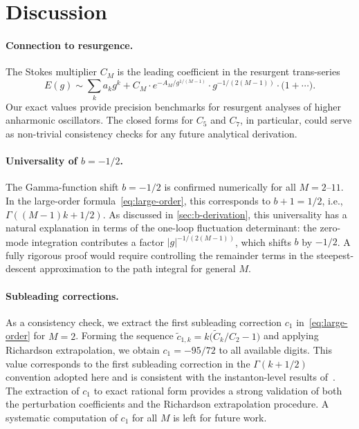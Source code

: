 \documentclass[12pt,a4paper]{article}
\numberwithin{equation}{section}
\theoremstyle{plain}
\theoremstyle{definition}
\theoremstyle{remark}
\begin{document}
\section{Discussion}
\label{sec:discussion}

\paragraph{Connection to resurgence.}
The Stokes multiplier $C_M$ is the leading coefficient in the resurgent
trans-series
\begin{equation}\label{eq:trans-series}
  E(g) \sim \sum_k a_k g^k + C_M \cdot e^{-A_M/g^{1/(M-1)}} \cdot
  g^{-1/(2(M-1))} \cdot \bigl(1 + \cdots\bigr).
\end{equation}
Our exact values provide precision benchmarks for resurgent analyses of
higher anharmonic oscillators. The closed forms for $C_5$ and $C_7$, in
particular, could serve as non-trivial consistency checks for any future
analytical derivation.

\paragraph{Universality of $b = -1/2$.}
The Gamma-function shift $b = -1/2$ is confirmed numerically for all
$M = 2$--$11$. In the large-order formula~\eqref{eq:large-order}, this
corresponds to $b + 1 = 1/2$, i.e., $\Gamma((M{-}1)k + 1/2)$. As
discussed in \cref{sec:b-derivation}, this universality has a natural
explanation in terms of the one-loop fluctuation determinant: the
zero-mode integration contributes a factor $|g|^{-1/(2(M-1))}$, which
shifts $b$ by $-1/2$. A fully rigorous proof would require controlling
the remainder terms in the steepest-descent approximation to the path
integral for general $M$.

\paragraph{Subleading corrections.}
As a consistency check, we extract the first subleading correction $c_1$
in~\eqref{eq:large-order} for $M = 2$. Forming the sequence
$\widetilde{c}_{1,k} = k\bigl(\widetilde{C}_k/C_2 - 1\bigr)$ and
applying Richardson extrapolation, we obtain $c_1 = -95/72$ to all
available digits. This value corresponds to the first subleading
correction in the $\Gamma(k + 1/2)$ convention adopted here and is
consistent with the instanton-level results
of~\cite{ZJJ2004,ZJJ2010}. The extraction of $c_1$ to exact rational
form provides a strong validation of both the perturbation coefficients
and the Richardson extrapolation procedure. A systematic computation of
$c_1$ for all $M$ is left for future work.
\end{document}
